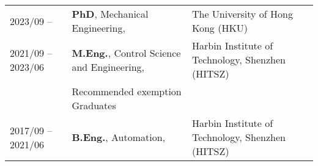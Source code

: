 %
%



\begin{tabular}{lll}	
	\textsc{2023/09 -- }			  & \textbf{PhD}, Mechanical Engineering, & {The University of Hong Kong (HKU)}\\
	\textsc{2021/09 -- 2023/06} 	&  \textbf{M.Eng.},  Control Science and Engineering, & {Harbin Institute of Technology, Shenzhen (HITSZ)}
	\\ &  Recommended exemption Graduates \\
	\textsc{2017/09 -- 2021/06} 	&  \textbf{B.Eng.}, Automation, & {Harbin Institute of Technology, Shenzhen (HITSZ)}\\
									
\end{tabular}